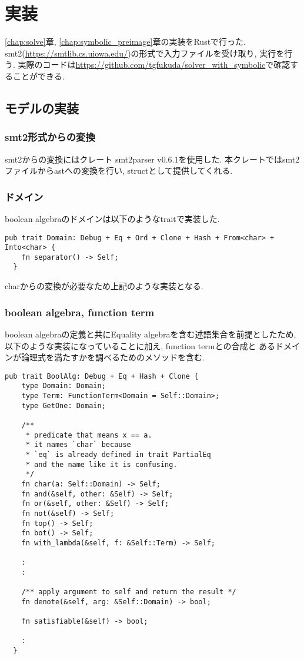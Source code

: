 \documentclass[uplatex,dvipdfmx,a4j]{jsreport}
\begin{document}
  \chapter{実装}  \label{chap:implementation}

  \ref{chap:solve}章, \ref{chap:symbolic_preimage}章の実装をRustで行った.
  smt2(\url{https://smtlib.cs.uiowa.edu/})の形式で入力ファイルを受け取り, 実行を行う.
  実際のコードは\url{https://github.com/tgfukuda/solver_with_symbolic}で確認することができる.

  \section{モデルの実装}

  \subsection{smt2形式からの変換}
  smt2からの変換にはクレート smt2parser v0.6.1を使用した.
  本クレートではsmt2ファイルからastへの変換を行い, structとして提供してくれる.

  \subsection{ドメイン}
  boolean algebraのドメインは以下のようなtraitで実装した.
  \begin{lstlisting}[caption=Domain, label=domain_impl]
  pub trait Domain: Debug + Eq + Ord + Clone + Hash + From<char> + Into<char> {
    fn separator() -> Self;
  }
  \end{lstlisting}
  charからの変換が必要なため上記のような実装となる.

  \subsection{boolean algebra, function term}
  boolean algebraの定義と共にEquality algebraを含む述語集合を前提としたため,
  以下のような実装になっていることに加え, function termとの合成と
  あるドメインが論理式を満たすかを調べるためのメソッドを含む.
  \begin{lstlisting}[caption={boolean algebra}, label=bool_alg_impl]
  pub trait BoolAlg: Debug + Eq + Hash + Clone {
    type Domain: Domain;
    type Term: FunctionTerm<Domain = Self::Domain>;
    type GetOne: Domain;

    /**
     * predicate that means x == a.
     * it names `char` because
     * `eq` is already defined in trait PartialEq
     * and the name like it is confusing.
     */
    fn char(a: Self::Domain) -> Self;
    fn and(&self, other: &Self) -> Self;
    fn or(&self, other: &Self) -> Self;
    fn not(&self) -> Self;
    fn top() -> Self;
    fn bot() -> Self;
    fn with_lambda(&self, f: &Self::Term) -> Self;

    :
    :

    /** apply argument to self and return the result */
    fn denote(&self, arg: &Self::Domain) -> bool;

    fn satisfiable(&self) -> bool;

    :
  }
  \end{lstlisting}
\end{document}
